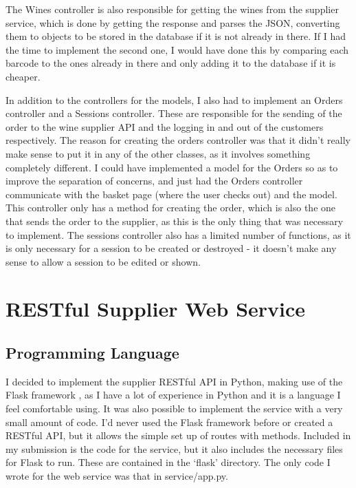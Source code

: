 \documentclass[a4paper,12pt,hidelinks]{report}
\begin{document}
    The Wines controller is also responsible for getting the wines from the supplier service, which is done by getting the response and parses the
    JSON, converting them to objects to be stored in the database if it is not already in there. If I had the time to implement the second one,
    I would have done this by comparing each barcode to the ones already in there and only adding it to the database if it is cheaper.
    
    In addition to the controllers for the models, I also had to implement an Orders controller and a Sessions controller. These are responsible
    for the sending of the order to the wine supplier API and the logging in and out of the customers respectively. The reason for creating the 
    orders controller was that it didn't really make sense to put it in any of the other classes, as it involves something completely different.
    I could have implemented a model for the Orders so as to improve the separation of concerns, and just had the Orders controller communicate
    with the basket page (where the user checks out) and the model. This controller only has a method for creating the order, which is
    also the one that sends the order to the supplier, as this is the only thing that was necessary to implement. The sessions controller also
    has a limited number of functions, as it is only necessary for a session to be created or destroyed - it doesn't make any sense to allow a session
    to be edited or shown.

    \section{RESTful Supplier Web Service}
    \subsection{Programming Language}
    I decided to implement the supplier RESTful API in Python, making use of the Flask framework \cite{flask-framework}, as I have a lot of experience in
    Python and it is a language I feel comfortable using. It was also possible to implement the service with a very small amount of code.
    I'd never used the Flask framework before or created a RESTful API, but it allows the simple set up of routes with methods. Included in
    my submission is the code for the service, but it also includes the necessary files for Flask to run. These are contained in the `flask' directory.
    The only code I wrote for the web service was that in service/app.py.
\end{document}
